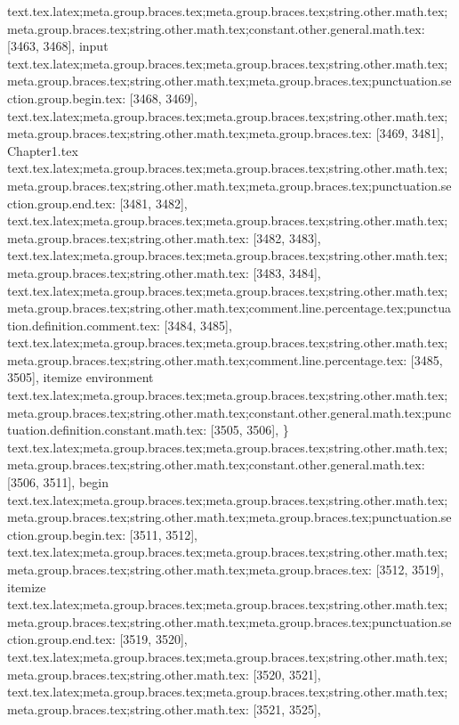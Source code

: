{{{{{{{{{{{{{{{{{{{{{{{{{{{{{{{{{{{{{{{{{{{{{{{{{{{{{{{{{{{{{{{{{{{{{{{{{{{{{{{{{{{{{{{{{{{{{{{{{{{{{{{{{text.tex.latex;meta.group.braces.tex;meta.group.braces.tex;string.other.math.tex;meta.group.braces.tex;string.other.math.tex;constant.other.general.math.tex: [3463, 3468], {input}
text.tex.latex;meta.group.braces.tex;meta.group.braces.tex;string.other.math.tex;meta.group.braces.tex;string.other.math.tex;meta.group.braces.tex;punctuation.section.group.begin.tex: [3468, 3469], {{}
text.tex.latex;meta.group.braces.tex;meta.group.braces.tex;string.other.math.tex;meta.group.braces.tex;string.other.math.tex;meta.group.braces.tex: [3469, 3481], {Chapter1.tex}
text.tex.latex;meta.group.braces.tex;meta.group.braces.tex;string.other.math.tex;meta.group.braces.tex;string.other.math.tex;meta.group.braces.tex;punctuation.section.group.end.tex: [3481, 3482], {}}
text.tex.latex;meta.group.braces.tex;meta.group.braces.tex;string.other.math.tex;meta.group.braces.tex;string.other.math.tex: [3482, 3483], {
}
text.tex.latex;meta.group.braces.tex;meta.group.braces.tex;string.other.math.tex;meta.group.braces.tex;string.other.math.tex: [3483, 3484], {
}
text.tex.latex;meta.group.braces.tex;meta.group.braces.tex;string.other.math.tex;meta.group.braces.tex;string.other.math.tex;comment.line.percentage.tex;punctuation.definition.comment.tex: [3484, 3485], {%
text.tex.latex;meta.group.braces.tex;meta.group.braces.tex;string.other.math.tex;meta.group.braces.tex;string.other.math.tex;comment.line.percentage.tex: [3485, 3505], {itemize environment
}
text.tex.latex;meta.group.braces.tex;meta.group.braces.tex;string.other.math.tex;meta.group.braces.tex;string.other.math.tex;constant.other.general.math.tex;punctuation.definition.constant.math.tex: [3505, 3506], {\}
text.tex.latex;meta.group.braces.tex;meta.group.braces.tex;string.other.math.tex;meta.group.braces.tex;string.other.math.tex;constant.other.general.math.tex: [3506, 3511], {begin}
text.tex.latex;meta.group.braces.tex;meta.group.braces.tex;string.other.math.tex;meta.group.braces.tex;string.other.math.tex;meta.group.braces.tex;punctuation.section.group.begin.tex: [3511, 3512], {{}
text.tex.latex;meta.group.braces.tex;meta.group.braces.tex;string.other.math.tex;meta.group.braces.tex;string.other.math.tex;meta.group.braces.tex: [3512, 3519], {itemize}
text.tex.latex;meta.group.braces.tex;meta.group.braces.tex;string.other.math.tex;meta.group.braces.tex;string.other.math.tex;meta.group.braces.tex;punctuation.section.group.end.tex: [3519, 3520], {}}
text.tex.latex;meta.group.braces.tex;meta.group.braces.tex;string.other.math.tex;meta.group.braces.tex;string.other.math.tex: [3520, 3521], {
}
text.tex.latex;meta.group.braces.tex;meta.group.braces.tex;string.other.math.tex;meta.group.braces.tex;string.other.math.tex: [3521, 3525], {    }
}}}}}}}}}}}}}}}}}}}}}}}}}}}}}}}}}}}}}}}}}}}}}}}}}}}}}}}}}}}}}}}}}}}}}}}}}}}}}}}}}}}}}}}}}}}}}}}}}}}}}}}}}}}
